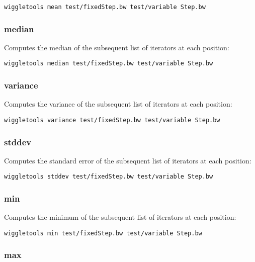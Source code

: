 \documentclass[12pt]{article}
\begin{document}
\begin{verbatim}
wiggletools mean test/fixedStep.bw test/variable Step.bw 
\end{verbatim}

\subsubsection{median}

Computes the median of the subsequent list of iterators at each position:

\begin{verbatim}
wiggletools median test/fixedStep.bw test/variable Step.bw 
\end{verbatim}

\subsubsection{variance}


Computes the variance of the subsequent list of iterators at each position:

\begin{verbatim}
wiggletools variance test/fixedStep.bw test/variable Step.bw 
\end{verbatim}

\subsubsection{stddev}

Computes the standard error of the subsequent list of iterators at each position:

\begin{verbatim}
wiggletools stddev test/fixedStep.bw test/variable Step.bw 
\end{verbatim}

\subsubsection{min}


Computes the minimum of the subsequent list of iterators at each position:

\begin{verbatim}
wiggletools min test/fixedStep.bw test/variable Step.bw 
\end{verbatim}

\subsubsection{max}
\end{document}
